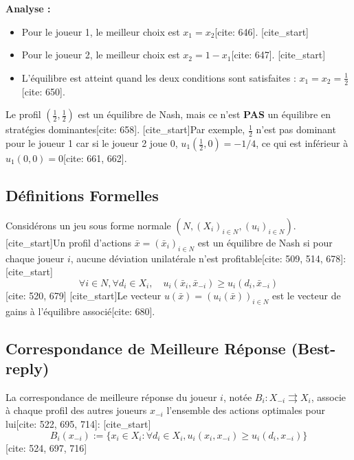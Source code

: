 \textbf{Analyse :}
\begin{itemize}
    [cite_start]\item Pour le joueur 1, le meilleur choix est $x_1 = x_2$[cite: 646].
    [cite_start]\item Pour le joueur 2, le meilleur choix est $x_2 = 1 - x_1$[cite: 647].
    [cite_start]\item L'équilibre est atteint quand les deux conditions sont satisfaites : $x_1 = x_2 = \frac{1}{2}$[cite: 650].
\end{itemize}

\begin{remark}
Le profil $(\frac{1}{2}, \frac{1}{2})$ est un équilibre de Nash, mais ce n'est \textbf{PAS} un équilibre en stratégies dominantes[cite: 658]. [cite_start]Par exemple, $\frac{1}{2}$ n'est pas dominant pour le joueur 1 car si le joueur 2 joue $0$, $u_1(\frac{1}{2}, 0) = -1/4$, ce qui est inférieur à $u_1(0,0) = 0$[cite: 661, 662].
\end{remark}

\subsection{Définitions Formelles}

\begin{definition}
Considérons un jeu sous forme normale $(N, (X_i)_{i \in N}, (u_i)_{i \in N})$. [cite_start]Un profil d'actions $\bar{x} = (\bar{x}_i)_{i \in N}$ est un équilibre de Nash si pour chaque joueur $i$, aucune déviation unilatérale n'est profitable[cite: 509, 514, 678]:
[cite_start]$$\forall i \in N, \forall d_i \in X_i, \quad u_i(\bar{x}_i, \bar{x}_{-i}) \ge u_i(d_i, \bar{x}_{-i})$$ [cite: 520, 679]
[cite_start]Le vecteur $u(\bar{x}) = (u_i(\bar{x}))_{i \in N}$ est le vecteur de gains à l'équilibre associé[cite: 680].
\end{definition}

\subsection{Correspondance de Meilleure Réponse (Best-reply)}

\begin{definition}La correspondance de meilleure réponse du joueur $i$, notée $B_i : X_{-i} \rightrightarrows X_i$, associe à chaque profil des autres joueurs $x_{-i}$ l'ensemble des actions optimales pour lui[cite: 522, 695, 714]:
[cite_start]$$B_i(x_{-i}) := \{ x_i \in X_i : \forall d_i \in X_i, u_i(x_i, x_{-i}) \ge u_i(d_i, x_{-i}) \}$$ [cite: 524, 697, 716]
\end{definition}

